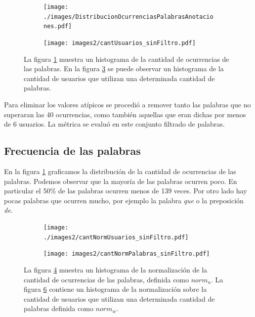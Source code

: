 \begin{figure}[!ht]\centering
  \begin{subfigure}[t]{0.49\textwidth}
    \texttt{[image: ./images/DistribucionOcurrenciasPalabrasAnotaciones.pdf]}
    \caption{}
    \label{fig:cantPalabras} 
   \end{subfigure}
   \begin{subfigure}[t]{0.49\textwidth}
    \texttt{[image: images2/cantUsuarios\_sinFiltro.pdf]}
    \caption{}
    \label{fig:cantPalabrasPromedio} 
   \end{subfigure}
   \caption{La figura \ref{fig:cantPalabras} muestra un histograma de la cantidad de ocurrencias de las palabras. En la figura \ref{fig:cantPalabrasPromedio} se puede observar un histograma de la cantidad de usuarios que utilizan una determinada cantidad de palabras.}  
\end{figure}

Para eliminar los valores atípicos se procedió a remover tanto las palabras que no superaran las 40 ocurrencias, como también aquellas que eran dichas por menos de 6 usuarios. La métrica se evaluó en este conjunto filtrado de palabras. 

\subsection{Frecuencia de las palabras}
\label{sub: frecuenciaPalabras}
En la figura \ref{fig:cantPalabras} graficamos la distribución de la cantidad de ocurrencias de las palabras. Podemos observar que la mayoría de las palabras ocurren poco. En particular el 50\% de las palabras ocurren menos de 139 veces. Por otro lado hay pocas palabras que ocurren mucho, por ejemplo la palabra \textit{que} o la preposición \textit{de}.


\begin{figure}[!ht]\centering
  \begin{subfigure}[t]{0.49\textwidth}
    \texttt{[image: ./images2/cantNormUsuarios\_sinFiltro.pdf]}
    \caption{} 
    \label{fig:cantNormUsuarios} 
   \end{subfigure}
   \begin{subfigure}[t]{0.49\textwidth}
    \texttt{[image: images2/cantNormPalabras\_sinFiltro.pdf]}
    \caption{} 
    \label{fig:cantNormPalabras} 
   \end{subfigure}
   \caption{La figura \ref{fig:cantNormUsuarios} muestra un histograma de la normalización de la cantidad de ocurrencias de las palabras, definida como $norm_u$. La figura \ref{fig:cantNormPalabras} contiene un histograma de la normalización sobre la cantidad de usuarios que utilizan una determinada cantidad de palabras definida como $norm_w$.}
\end{figure}


